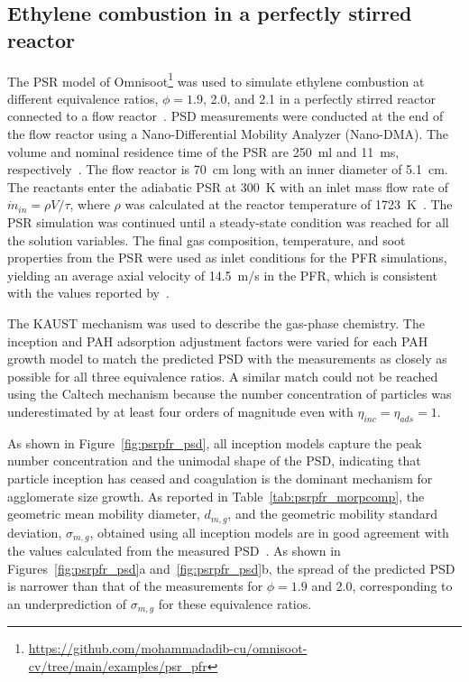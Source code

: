 \subsection{Ethylene combustion in a perfectly stirred reactor}
The PSR model of Omnisoot\footnote{\href{https://github.com/mohammadadib-cu/omnisoot-cv/tree/main/examples/psr_pfr}{https://github.com/mohammadadib-cu/omnisoot-cv/tree/main/examples/psr\_pfr}} was used to simulate ethylene combustion at different equivalence ratios, $\phi = 1.9$, 2.0, and 2.1 in a perfectly stirred reactor connected to a flow reactor~\citep{manzello2007soot}. PSD measurements were conducted at the end of the flow reactor using a Nano-Differential Mobility Analyzer (Nano-DMA). The volume and nominal residence time of the PSR are 250~ml and 11~ms, respectively~\citep{manzello2007soot}. The flow reactor is 70~cm long with an inner diameter of 5.1~cm. The reactants enter the adiabatic PSR at 300~K with an inlet mass flow rate of $\dot{m}_{in} = \rho V / \tau$, where $\rho$ was calculated at the reactor temperature of 1723~K~\citep{lenhert2009effects}. The PSR simulation was continued until a steady-state condition was reached for all the solution variables. The final gas composition, temperature, and soot properties from the PSR were used as inlet conditions for the PFR simulations, yielding an average axial velocity of 14.5~m/s in the PFR, which is consistent with the values reported by~\citet{manzello2007soot}.

The KAUST mechanism was used to describe the gas-phase chemistry. The inception and PAH adsorption adjustment factors were varied for each PAH growth model to match the predicted PSD with the measurements as closely as possible for all three equivalence ratios. A similar match could not be reached using the Caltech mechanism because the number concentration of particles was underestimated by at least four orders of magnitude even with $\eta_{inc}=\eta_{ads}=1$. 

As shown in Figure~\ref{fig:psrpfr_psd}, all inception models capture the peak number concentration and the unimodal shape of the PSD, indicating that particle inception has ceased and coagulation is the dominant mechanism for agglomerate size growth. As reported in Table~\ref{tab:psrpfr_morpcomp}, the geometric mean mobility diameter, $d_{m,g}$, and the geometric mobility standard deviation, $\sigma_{m,g}$, obtained using all inception models are in good agreement with the values calculated from the measured PSD~\citep{manzello2007soot}. As shown in Figures~\ref{fig:psrpfr_psd}a and~\ref{fig:psrpfr_psd}b, the spread of the predicted PSD is narrower than that of the measurements for $\phi = 1.9$ and 2.0, corresponding to an underprediction of $\sigma_{m,g}$ for these equivalence ratios.



